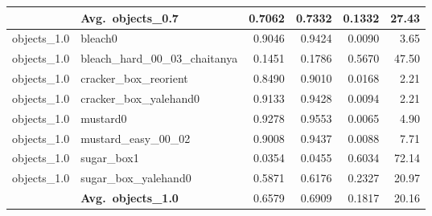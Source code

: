 \begin{longtable}{llrrrr}
  \cmidrule{2-6}
  & \textbf{Avg.~objects_0.7} & 0.7062 & 0.7332 & 0.1332 & 27.43 \\
  \midrule
  objects_1.0 & bleach0 & 0.9046 & 0.9424 & 0.0090 & 3.65 \\
  objects_1.0 & bleach\_hard\_00\_03\_chaitanya & 0.1451 & 0.1786 & 0.5670 & 47.50 \\
  objects_1.0 & cracker\_box\_reorient & 0.8490 & 0.9010 & 0.0168 & 2.21 \\
  objects_1.0 & cracker\_box\_yalehand0 & 0.9133 & 0.9428 & 0.0094 & 2.21 \\
  objects_1.0 & mustard0 & 0.9278 & 0.9553 & 0.0065 & 4.90 \\
  objects_1.0 & mustard\_easy\_00\_02 & 0.9008 & 0.9437 & 0.0088 & 7.71 \\
  objects_1.0 & sugar\_box1 & 0.0354 & 0.0455 & 0.6034 & 72.14 \\
  objects_1.0 & sugar\_box\_yalehand0 & 0.5871 & 0.6176 & 0.2327 & 20.97 \\
  \cmidrule{2-6}
  & \textbf{Avg.~objects_1.0} & 0.6579 & 0.6909 & 0.1817 & 20.16 \\
  \midrule
\bottomrule
\end{longtable}